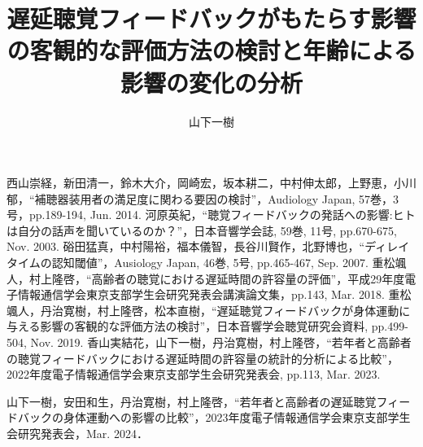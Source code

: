 \documentclass[twocolumn]{jsarticle}
\title{遅延聴覚フィードバックがもたらす影響の客観的な評価方法の検討と年齢による影響の変化の分析}
\author{山下\hspace{1zw}一樹}
\begin{document}
\maketitle


% 






\begin{thebibliography}{99}
	西山崇経，新田清一，鈴木大介，岡崎宏，坂本耕二，中村伸太郎，上野恵，小川郁，``補聴器装用者の満足度に関わる要因の検討''，Audiology Japan, 57巻，3号，pp.189-194, Jun. 2014.
	河原英紀，``聴覚フィードバックの発話への影響:ヒトは自分の話声を聞いているのか？''，日本音響学会誌, 59巻, 11号, pp.670-675, Nov. 2003.
	硲田猛真，中村陽裕，福本儀智，長谷川賢作，北野博也，``ディレイタイムの認知閾値''，Ausiology Japan, 46巻, 5号, pp.465-467, Sep. 2007.
	重松颯人，村上隆啓，``高齢者の聴覚における遅延時間の許容量の評価''，平成29年度電子情報通信学会東京支部学生会研究発表会講演論文集，pp.143, Mar. 2018.
	重松颯人，丹治寛樹，村上隆啓，松本直樹，``遅延聴覚フィードバックが身体運動に与える影響の客観的な評価方法の検討''，日本音響学会聴覚研究会資料, pp.499-504, Nov. 2019.
	香山実結花，山下一樹，丹治寛樹，村上隆啓，``若年者と高齢者の聴覚フィードバックにおける遅延時間の許容量の統計的分析による比較''，2022年度電子情報通信学会東京支部学生会研究発表会, pp.113, Mar. 2023.
\end{thebibliography}

\begin{thepublished}{99}
	山下一樹，安田和生，丹治寛樹，村上隆啓，``若年者と高齢者の遅延聴覚フィードバックの身体運動への影響の比較''，2023年度電子情報通信学会東京支部学生会研究発表会，Mar. 2024．
\end{thepublished}
\end{document}
